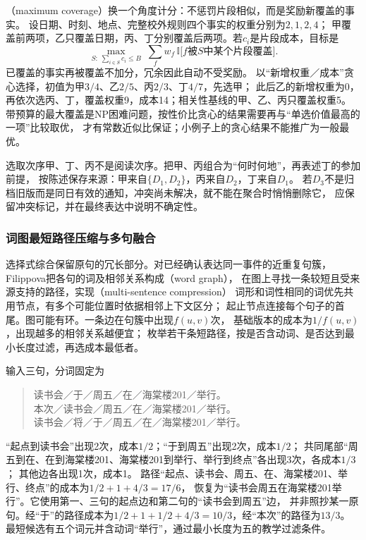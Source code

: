 （maximum coverage）换一个角度计分：不惩罚片段相似，而是奖励新覆盖的事实。
设日期、时刻、地点、完整校外规则四个事实的权重分别为$2,1,2,4$；
甲覆盖前两项，乙只覆盖日期，丙、丁分别覆盖后两项。若$c_i$是片段成本，目标是
\begin{equation}
  \max_{S:\;\sum_{i\in S}c_i\leq B}\;\sum_{f}w_f\,\mathbb{I}\bigl[f\text{被}S\text{中某个片段覆盖}\bigr].
  \label{eq:nlp-generation-max-coverage}
\end{equation}
已覆盖的事实再被覆盖不加分，冗余因此自动不受奖励。
以“新增权重／成本”贪心选择，初值为甲$3/4$、乙$2/5$、丙$2/3$、丁$4/7$，先选甲；
此后乙的新增权重为0，再依次选丙、丁，覆盖权重9，成本14；相关性基线的甲、乙、丙只覆盖权重5。
带预算的最大覆盖是NP困难问题，按性价比贪心的结果需要再与“单选价值最高的一项”比较取优，
才有常数近似比保证；小例子上的贪心结果不能推广为一般最优。

选取次序甲、丁、丙不是阅读次序。把甲、丙组合为“何时何地”，再表述丁的参加前提，
按陈述保存来源：甲来自$\{D_1,D_2\}$，丙来自$D_2$，丁来自$D_1$。
若$D_3$不是归档旧版而是同日有效的通知，冲突尚未解决，就不能在聚合时悄悄删除它，
应保留冲突标记，并在最终表达中说明不确定性。

\subsubsection{词图最短路径压缩与多句融合}
\label{sec:nlp-generation-word-graph}

选择式综合保留原句的冗长部分。对已经确认表达同一事件的近重复句簇，
Filippova把各句的词及相邻关系构成（word graph），
在图上寻找一条较短且受来源支持的路径，实现（multi-sentence compression）
词形和词性相同的词优先共用节点，有多个可能位置时依据相邻上下文区分；
起止节点连接每个句子的首尾。图可能有环。一条边在句簇中出现$f(u,v)$次，
基础版本的成本为$1/f(u,v)$，出现越多的相邻关系越便宜；
枚举若干条短路径，按是否含动词、是否达到最小长度过滤，再选成本最低者。

输入三句，分词固定为
\begin{quote}
读书会／于／周五／在／海棠楼201／举行。\\
本次／读书会／周五／在／海棠楼201／举行。\\
读书会／将／于／周五／在／海棠楼201／举行。
\end{quote}
“起点到读书会”出现2次，成本$1/2$；“于到周五”出现2次，成本$1/2$；
共同尾部“周五到在、在到海棠楼201、海棠楼201到举行、举行到终点”各出现3次，各成本$1/3$；
其他边各出现1次，成本1。
路径“起点、读书会、周五、在、海棠楼201、举行、终点”的成本为$1/2+1+4/3=17/6$，
恢复为“读书会周五在海棠楼201举行”。它使用第一、三句的起点边和第二句的“读书会到周五”边，
并非照抄某一原句。经“于”的路径成本为$1/2+1+1/2+4/3=10/3$，经“本次”的路径为$13/3$。
最短候选有五个词元并含动词“举行”，通过最小长度为五的教学过滤条件。

